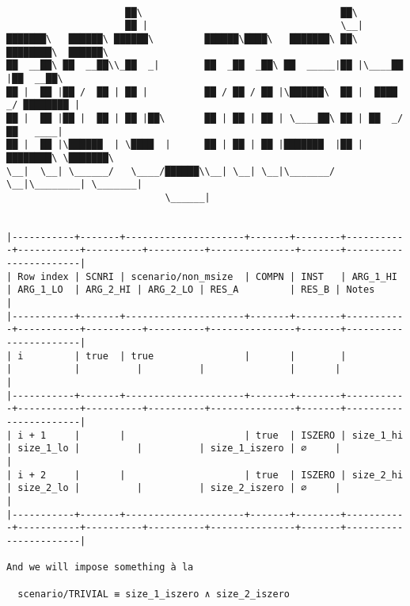 \documentclass[varwidth=\maxdimen,margin=0.5cm,multi={verbatim}]{standalone}
\begin{document}
\begin{verbatim}

                     ██\                                   ██\
                     ██ |                                  \__|
███████\   ██████\ ██████\         ██████\████\   ███████\ ██\ ████████\  ██████\
██  __██\ ██  __██\\_██  _|        ██  _██  _██\ ██  _____|██ |\____██  |██  __██\
██ |  ██ |██ /  ██ | ██ |          ██ / ██ / ██ |\██████\  ██ |  ████ _/ ████████ |
██ |  ██ |██ |  ██ | ██ |██\       ██ | ██ | ██ | \____██\ ██ | ██  _/   ██   ____|
██ |  ██ |\██████  | \████  |      ██ | ██ | ██ |███████  |██ |████████\ \███████\
\__|  \__| \______/   \____/██████\\__| \__| \__|\_______/ \__|\________| \_______|
                            \______|


|-----------+-------+---------------------+-------+--------+-----------+-----------+----------+----------+---------------+-------+-----------------------|
| Row index | SCNRI | scenario/non_msize  | COMPN | INST   | ARG_1_HI  | ARG_1_LO  | ARG_2_HI | ARG_2_LO | RES_A         | RES_B | Notes                 |
|-----------+-------+---------------------+-------+--------+-----------+-----------+----------+----------+---------------+-------+-----------------------|
| i         | true  | true                |       |        |           |           |          |          |               |       |                       |
|-----------+-------+---------------------+-------+--------+-----------+-----------+----------+----------+---------------+-------+-----------------------|
| i + 1     |       |                     | true  | ISZERO | size_1_hi | size_1_lo |          |          | size_1_iszero | ∅     |                       |
| i + 2     |       |                     | true  | ISZERO | size_2_hi | size_2_lo |          |          | size_2_iszero | ∅     |                       |
|-----------+-------+---------------------+-------+--------+-----------+-----------+----------+----------+---------------+-------+-----------------------|

And we will impose something à la

  scenario/TRIVIAL ≡ size_1_iszero ∧ size_2_iszero

\end{verbatim}
\end{document}
